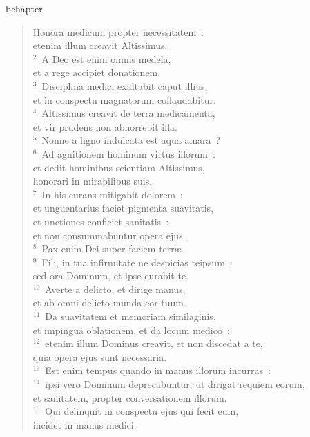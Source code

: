 bchapter\begin{verse}\vspace{-19pt}Honora medicum propter necessitatem~:\\ etenim illum creavit Altissimus.\\
${}^{2}$~A Deo est enim omnis medela,\\ et a rege accipiet donationem.\\
${}^{3}$~Disciplina medici exaltabit caput illius,\\ et in conspectu magnatorum collaudabitur.\\
${}^{4}$~Altissimus creavit de terra medicamenta,\\ et vir prudens non abhorrebit illa.\\
${}^{5}$~Nonne a ligno indulcata est aqua amara~?\\
${}^{6}$~Ad agnitionem hominum virtus illorum~:\\ et dedit hominibus scientiam Altissimus,\\ honorari in mirabilibus suis.\\
${}^{7}$~In his curans mitigabit dolorem~:\\ et unguentarius faciet pigmenta suavitatis,\\ et unctiones conficiet sanitatis~:\\ et non consummabuntur opera ejus.\\
${}^{8}$~Pax enim Dei super faciem terr\ae .\\
${}^{9}$~Fili, in tua infirmitate ne despicias teipsum~:\\ sed ora Dominum, et ipse curabit te.\\
${}^{10}$~Averte a delicto, et dirige manus,\\ et ab omni delicto munda cor tuum.\\
${}^{11}$~Da suavitatem et memoriam similaginis,\\ et impingua oblationem, et da locum medico~:\\
${}^{12}$~etenim illum Dominus creavit, et non discedat a te,\\ quia opera ejus sunt necessaria.\\
${}^{13}$~Est enim tempus quando in manus illorum incurras~:\\
${}^{14}$~ipsi vero Dominum deprecabuntur, ut dirigat requiem eorum,\\ et sanitatem, propter conversationem illorum.\\
${}^{15}$~Qui delinquit in conspectu ejus qui fecit eum,\\ incidet in manus medici.\end{verse}


